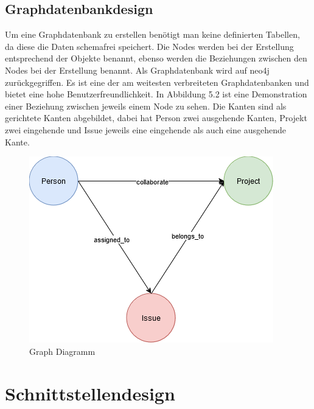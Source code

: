 \subsection{Graphdatenbankdesign} %
\label{sec:graphsdatenbankdesign}
Um eine Graphdatenbank zu erstellen benötigt man keine definierten Tabellen, da diese die Daten schemafrei speichert. Die Nodes werden bei der Erstellung entsprechend der Objekte benannt, ebenso werden die Beziehungen zwischen den Nodes bei der Erstellung benannt. Als Graphdatenbank wird auf neo4j zurückgegriffen. Es ist eine der am weitesten verbreiteten Graphdatenbanken und bietet eine hohe Benutzerfreundlichkeit. In Abbildung 5.2 ist eine Demonstration einer Beziehung zwischen jeweils einem Node zu sehen. Die Kanten sind als gerichtete Kanten abgebildet, dabei hat Person zwei ausgehende Kanten, Projekt zwei eingehende und Issue jeweils eine eingehende als auch eine ausgehende Kante. 


\begin{figure}[H]
	\centering
	\includegraphics[scale=.8]{Illustrations/graph_diagram}
	\caption{Graph Diagramm}
\end{figure}


\section{Schnittstellendesign} %
\label{sec:schnittstellendesign}

